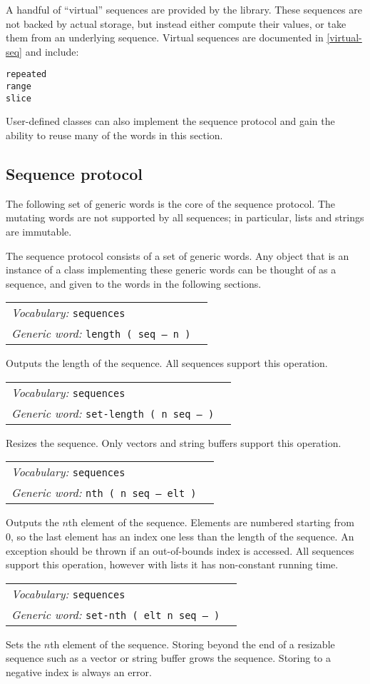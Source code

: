 \documentclass{book}
\newcommand{\vocabulary}[1]{\emph{Vocabulary:} \texttt{#1}&\\}
\newcommand{\genericword}[2]{\index{\texttt{#1}}\emph{Generic word:} \texttt{#2}&\\}
\newcommand{\wordtable}[1]{


\begin{tabularx}{12cm}{lX}
\hline
#1
\hline
\end{tabularx}

}
\begin{document}
A handful of ``virtual'' sequences are provided by the library. These sequences are not backed by actual storage, but instead either compute their values, or take them from an underlying sequence. Virtual sequences are documented in \ref{virtual-seq} and include:
\begin{verbatim}
repeated
range
slice
\end{verbatim}
User-defined classes can also implement the sequence protocol and gain the ability to reuse many of the words in this section.

\subsection{Sequence protocol}

The following set of generic words is the core of the sequence protocol. The mutating words are not supported by all sequences; in particular, lists and strings are immutable.

The sequence protocol consists of a set of generic words. Any object that is an instance of a class implementing these generic words can be thought of as a sequence, and given to the words in the following sections.

\wordtable{
\vocabulary{sequences}
\genericword{length}{length ( seq -- n )}
}
Outputs the length of the sequence. All sequences support this operation.
\wordtable{
\vocabulary{sequences}
\genericword{set-length}{set-length ( n seq -- )}
}
Resizes the sequence. Only vectors and string buffers support this operation.

\wordtable{
\vocabulary{sequences}
\genericword{nth}{nth ( n seq -- elt )}
}
Outputs the $n$th element of the sequence. Elements are numbered starting from 0, so the last element has an index one less than the length of the sequence. An exception should be thrown if an out-of-bounds index is accessed. All sequences support this operation, however with lists it has non-constant running time.

\wordtable{
\vocabulary{sequences}
\genericword{set-nth}{set-nth ( elt n seq -- )}
}
Sets the $n$th element of the sequence. Storing beyond the end of a resizable sequence such as a vector or string buffer grows the sequence. Storing to a negative index is always an error.
\end{document}
